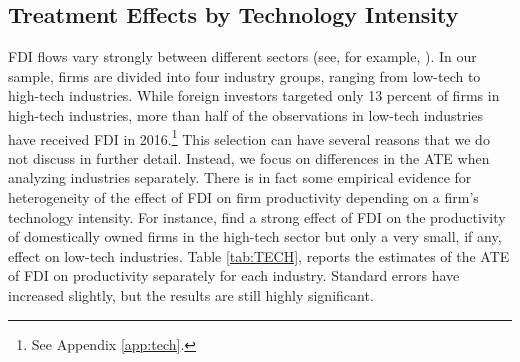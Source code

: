 \documentclass[a4paper,11pt]{scrartcl}
\begin{document}
\begin{table}[h]
\begin{threeparttable}
\begin{tablenotes}[flushleft]

 
\end{tablenotes}

\end{threeparttable}
\end{table}

\subsection{Treatment Effects by Technology Intensity}

FDI flows vary strongly between different sectors (see, for example, \citet{Smarzynska2004, Keller2009, Haskel2007}). In our sample, firms are divided into four industry groups, ranging from low-tech to high-tech industries. While foreign investors targeted only 13 percent of firms in high-tech industries, more than half of the observations in low-tech industries have received FDI in 2016.\footnote{See Appendix \ref{app:tech}.} This selection can have several reasons that we do not discuss in further detail.%
Instead, we focus on differences in the ATE when analyzing industries separately. 
There is in fact some empirical evidence for heterogeneity of the effect of FDI on firm productivity depending on a firm's technology intensity. 
For instance, \citet{Keller2009} find a strong effect of FDI on the productivity of domestically owned firms in the high-tech sector but only a very small, if any, effect on low-tech industries. Table \ref{tab:TECH}, reports the estimates of the ATE of FDI on productivity separately for each industry. Standard errors have increased slightly, but the results are still highly significant. 
\end{document}
